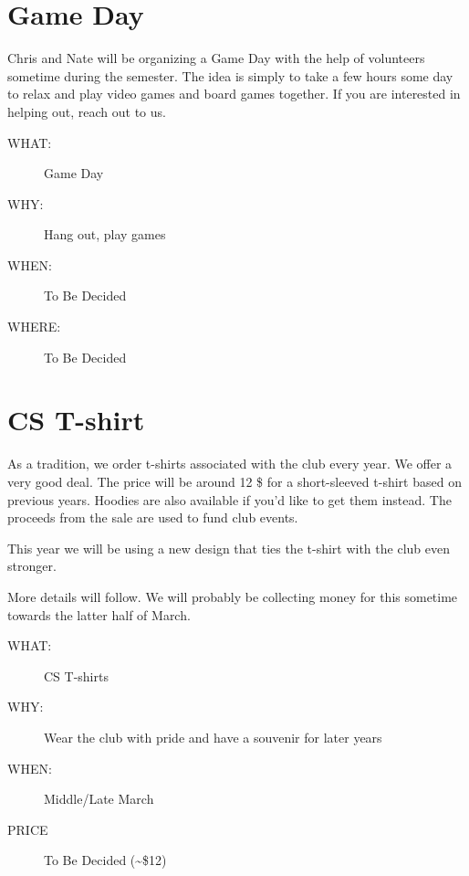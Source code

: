 \section{Game Day}
\label{sec-9}

Chris and Nate will be organizing a Game Day with the help of volunteers
sometime during the semester. The idea is simply to take a few hours some day
to relax and play video games and board games together. If you are interested
in helping out, reach out to us. 

\begin{description}
\item[{WHAT:}] Game Day
\item[{WHY:}] Hang out, play games
\item[{WHEN:}] To Be Decided
\item[{WHERE:}] To Be Decided
\end{description}


\newpage


\section{CS T-shirt}
\label{sec-10}

As a tradition, we order t-shirts associated with the club every year. We offer
a very good deal. The price will be around 12 \$ for a short-sleeved t-shirt
based on previous years. Hoodies are also available if you'd like to get them
instead. The proceeds from the sale are used to fund club events. 

This year we will be using a new design that ties the t-shirt with the club
even stronger.

More details will follow. We will probably be collecting money for this
sometime towards the latter half of March.

\begin{description}
\item[{WHAT:}] CS T-shirts
\item[{WHY:}] Wear the club with pride and have a souvenir for later years
\item[{WHEN:}] Middle/Late March
\item[{PRICE}] To Be Decided (\textasciitilde{}\$12)
\end{description}


\newpage



